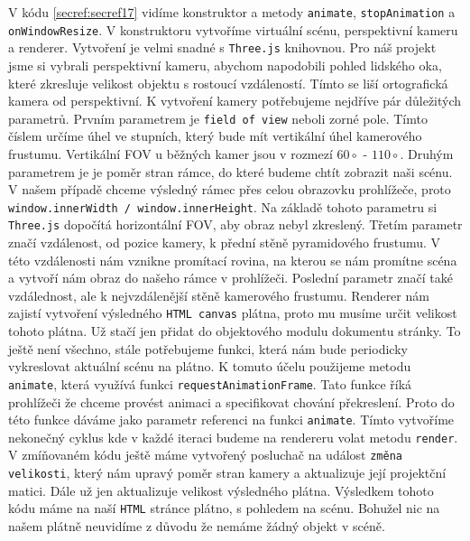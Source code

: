 \documentclass[czech,bachelor,dept420,male,cpdeclaration]{diploma}
\begin{document}
\begin{minipage}{\linewidth}

\end{minipage}

V kódu \ref{secref:secref17} vidíme konstruktor a metody \texttt{animate}, \texttt{stopAnimation} a \texttt{onWindowResize}. V konstruktoru vytvoříme virtuální scénu, perspektivní kameru a renderer. Vytvoření je velmi snadné s \texttt{Three.js} knihovnou. Pro náš projekt jsme si vybrali perspektivní kameru, abychom napodobili pohled lidského oka, které zkresluje velikost objektu s rostoucí vzdáleností. Tímto se liší ortografická kamera od perspektivní. K vytvoření kamery potřebujeme nejdříve pár důležitých parametrů. Prvním parametrem je \texttt{field of view} neboli zorné pole. Tímto číslem určíme úhel ve stupních, který bude mít vertikální úhel kamerového frustumu. Vertikální FOV u běžných kamer jsou v rozmezí $60\circ$ - $110\circ$. Druhým parametrem je je poměr stran rámce, do které budeme chtít zobrazit naši scénu. V našem případě chceme výsledný rámec přes celou obrazovku prohlížeče, proto \texttt{window.innerWidth / window.innerHeight}. Na základě tohoto parametru si \texttt{Three.js} dopočítá horizontální FOV, aby obraz nebyl zkreslený. Třetím parametr značí vzdálenost, od pozice kamery, k přední stěně pyramidového frustumu. V této vzdálenosti nám vznikne promítací rovina, na kterou se nám promítne scéna a vytvoří nám obraz do našeho rámce v prohlížeči. Poslední parametr značí také vzdálednost, ale k nejvzdálenější stěně kamerového frustumu. Renderer nám zajistí vytvoření výsledného \texttt{HTML canvas} plátna, proto mu musíme určit velikost tohoto plátna. Už stačí jen přidat do objektového modulu dokumentu stránky. To ještě není všechno, stále potřebujeme funkci, která nám bude periodicky vykreslovat aktuální scénu na plátno. K tomuto účelu použijeme metodu \texttt{animate}, která využívá funkci \texttt{requestAnimationFrame}. Tato funkce říká prohlížeči že chceme provést animaci a specifikovat chování překreslení. Proto do této funkce dáváme jako parametr referenci na funkci \texttt{animate}. Tímto vytvoříme nekonečný cyklus kde v každé iteraci budeme na rendereru volat metodu \texttt{render}. V zmíňovaném kódu ještě máme vytvořený posluchač na událost \texttt{změna velikosti}, který nám upravý poměr stran kamery a aktualizuje její projektční matici. Dále už jen aktualizuje velikost výsledného plátna. Výsledkem tohoto kódu máme na naší \texttt{HTML} stránce plátno, s pohledem na scénu. Bohužel nic na našem plátně neuvidíme z důvodu že nemáme žádný objekt v scéně.
\end{document}
